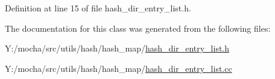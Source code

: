 Definition at line 15 of file hash\_\-dir\_\-entry\_\-list.h.



The documentation for this class was generated from the following files:\begin{DoxyCompactItemize}
\item 
Y:/mocha/src/utils/hash/hash\_\-map/\hyperlink{hash__dir__entry__list_8h}{hash\_\-dir\_\-entry\_\-list.h}\item 
Y:/mocha/src/utils/hash/hash\_\-map/\hyperlink{hash__dir__entry__list_8cc}{hash\_\-dir\_\-entry\_\-list.cc}\end{DoxyCompactItemize}
